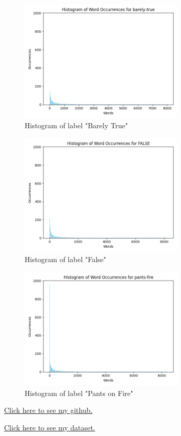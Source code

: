 \documentclass[12pt]{article}
\begin{document}
\begin{figure}[H]
	\begin{center}
 		\includegraphics[width = 0.7\textwidth]{Images/barely-true-histogram.png}
 		\caption{Histogram of label "Barely True"}
 		\label{fig:1}
	\end{center} 
\end{figure}

\begin{figure}[H]
	\begin{center}
 		\includegraphics[width = 0.7\textwidth]{Images/false-histogram.png}
 		\caption{Histogram of label "False"}
 		\label{fig:1}
	\end{center} 
\end{figure}

\begin{figure}[H]
	\begin{center}
 		\includegraphics[width = 0.7\textwidth]{Images/pants-fire-histogram.png}
 		\caption{Histogram of label "Pants on Fire"}
 		\label{fig:1}
	\end{center} 
\end{figure}

\href{https://github.com/lelnazrezaeel/News-Classification/tree/main}{\textcolor{istblue}{Click here to see my github.}}

\href{https://huggingface.co/datasets/elnazrezaee/News-Classification-Dataset/tree/main}{\textcolor{istblue}{Click here to see my dataset.}}
\end{document}
